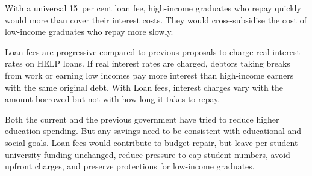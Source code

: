 \documentclass{grattan}
\begin{document}
\begin{overview}
With a universal 15~per cent loan fee, high-income graduates who repay quickly would more than cover their interest costs. They would cross-subsidise the cost of low-income graduates who repay more slowly.

\Gls{Loan fees} are progressive compared to previous proposals to charge real interest rates on \gls{HELP} loans.
If real interest rates are charged, debtors taking breaks from work or earning low incomes pay more interest than high-income earners with the same original debt.
With \gls{Loan fees}, interest charges vary with the amount borrowed but not with how long it takes to repay. 

Both the current and the previous government have tried to reduce higher education spending. But any savings need to be consistent with educational and social goals.
\Gls{Loan fees} would contribute to budget repair, but leave per student university funding unchanged, reduce pressure to cap student numbers, avoid upfront charges, and preserve protections for low-income graduates.
\end{overview}

\contentspage
\listoffigures







\end{document}

